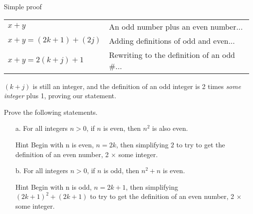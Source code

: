 \begin{intro}{Simple proof}
            \begin{center}
                \begin{tabular}{l l}
                    $x + y$         &       An odd number plus an even number...
                    \\
                    $x + y = (2k+1) + (2j) $    &   Adding definitions of odd and even...
                    \\
                    $x + y = 2(k + j) + 1 $     &   Rewriting to the definition of an odd \#...
                \end{tabular}
            \end{center}

            $(k+j)$ is still an integer, and the definition of an odd integer
            is 2 times \textit{some integer} plus 1, proving our statement.

        \end{intro}

        \begin{questionNOGRADE}{\thequestion}
            Prove the following statements.

            \begin{enumerate}
                \item[a.] For all integers $n > 0$, if $n$ is even, then $n^{2}$ is also even.

                    \begin{hint}{Hint}
                        Begin with n is even, $n = 2k$, then simplifying
                        $2$ to try to get the definition
                        of an even number, 2 $\times$ some integer.
                    \end{hint}

                \item[b.] For all integers $n > 0$, if $n$ is odd, then $n^{2} + n$ is even.

                    \begin{hint}{Hint}
                        Begin with n is odd, $n = 2k+1$, then simplifying
                        $(2k+1)^{2} + (2k+1)$ to try to get the definition
                        of an even number, 2 $\times$ some integer.
                    \end{hint}


            \end{enumerate}
        \end{questionNOGRADE}




